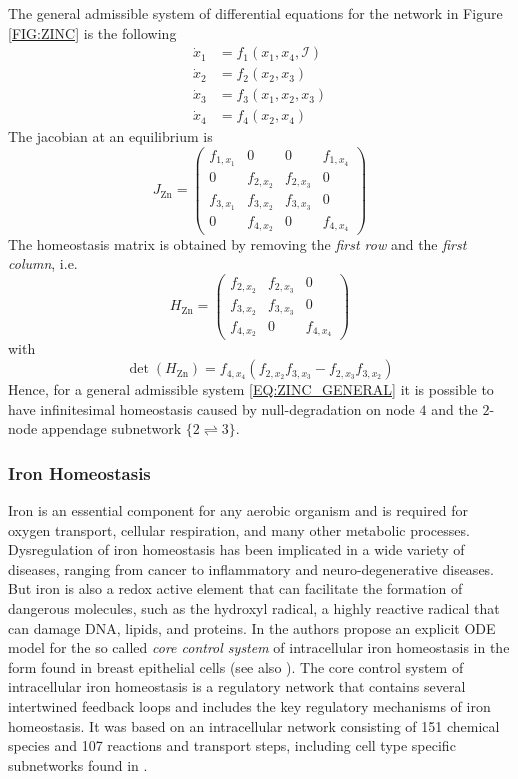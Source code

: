 \documentclass[a4paper,fleqn]{cas-dc}
\begin{document}
The general admissible system of differential equations for the network in Figure \ref{FIG:ZINC} is the following
\begin{equation} \label{EQ:ZINC_GENERAL}
\begin{aligned}
\dot{x}_1 & = f_1(x_1,x_4,\mathcal{I}) \\
\dot{x}_2 & = f_2(x_2,x_3) \\
\dot{x}_3 & = f_3(x_1,x_2,x_3) \\
\dot{x}_4 & = f_4(x_2,x_4)
\end{aligned}
\end{equation}
The jacobian at an equilibrium is
\[
J_{\mathrm{Zn}}  = \begin{pmatrix}
f_{1,x_1} & 0 & 0 & f_{1,x_4}   \\
0 & f_{2,x_2} & f_{2,x_3} & 0 \\
f_{3,x_1} & f_{3,x_2} & f_{3,x_3} & 0 \\
0 & f_{4,x_2} & 0 & f_{4,x_4}
\end{pmatrix}
\]
The homeostasis matrix is obtained by removing the \emph{first row} and the \emph{first column}, i.e.
\[
H_{\mathrm{Zn}} = \begin{pmatrix}
f_{2,x_2} & f_{2,x_3} & 0 \\
f_{3,x_2} & f_{3,x_3} & 0 \\
f_{4,x_2} & 0 & f_{4,x_4}
\end{pmatrix}
\]
with 
\[
\det(H_{\mathrm{Zn}}) = f_{4,x_4} 
(f_{2,x_2} f_{3,x_3} - f_{2,x_3}f_{3,x_2})
\]
Hence, for a general admissible system  \eqref{EQ:ZINC_GENERAL} it is possible to have infinitesimal homeostasis caused by null-degradation on node $4$ and the $2$-node appendage subnetwork $\{2 \rightleftharpoons 3\}$.

\subsubsection{Iron Homeostasis}

Iron is an essential component for any aerobic organism and is required for oxygen transport, cellular respiration, and many other metabolic processes.
Dysregulation of iron homeostasis has been implicated in a wide variety of diseases, ranging from cancer to inflammatory and neuro-degenerative diseases.
But iron is also a redox active element that can facilitate the formation of dangerous molecules, such as the hydroxyl radical, a highly reactive radical that can damage DNA, lipids, and proteins. 
In \cite{chifman2012} the authors propose an explicit ODE model for the so called \emph{core control system} of intracellular iron homeostasis in the form found in breast epithelial cells (see also \cite{omholt1998}). 
The core control system of intracellular iron homeostasis is a regulatory network that contains several intertwined feedback loops and includes the key regulatory mechanisms of iron homeostasis. It was based on an intracellular network consisting of 151 chemical species and 107 reactions and transport steps, including cell type specific subnetworks found in \cite{hower2009}.
\end{document}
